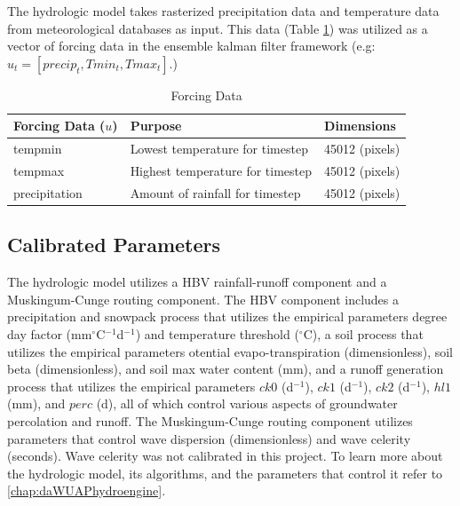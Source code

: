 The hydrologic model takes rasterized precipitation data and temperature data from meteorological databases as input. This data (Table \ref{tab:u_params}) was utilized as a vector of forcing data in the ensemble kalman filter framework (e.g: $u_{t} = [precip_{t},Tmin_{t}, Tmax_{t}]$.)

\begin{table}[]
\caption{Forcing Data} 
\begin{tabular}{lll}
Forcing Data ($u$) & Purpose                          & Dimensions \\ \hline
tempmin          & Lowest temperature for timestep  & 45012 (pixels) \\
tempmax          & Highest temperature for timestep & 45012 (pixels) \\
precipitation      & Amount of rainfall for timestep & 45012  (pixels)
\end{tabular}
\label{tab:u_params}
\end{table}

\subsection{Calibrated Parameters}

The hydrologic model utilizes a HBV rainfall-runoff component and a Muskingum-Cunge routing component. The HBV component includes a precipitation and snowpack process that utilizes the empirical parameters degree day factor (mm$^\circ$C$^{-1}$d$^{-1}$) and temperature threshold ($^\circ$C), a soil process that utilizes the empirical parameters otential evapo-transpiration (dimensionless), soil beta (dimensionless), and soil max water content (mm), and a runoff generation process that utilizes the empirical parameters $ck0$ (d$^{-1}$), $ck1$ (d$^{-1}$), $ck2$ (d$^{-1}$), $hl1$ (mm), and $perc$ (d), all of which control various aspects of groundwater percolation and runoff. The Muskingum-Cunge routing component utilizes parameters that control wave dispersion (dimensionless) and wave celerity (seconds). Wave celerity was not calibrated in this project. To learn more about the hydrologic model, its algorithms, and the parameters that control it refer to \autoref{chap:daWUAPhydroengine}.

